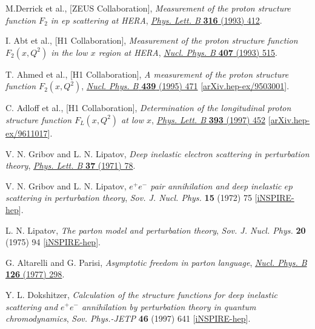 \documentclass[12pt]{article}
\begin{document}
\begin{thebibliography}{99}

M.Derrick et al., [ZEUS Collaboration], \emph{Measurement of the proton structure function $F_2$ in ep scattering at HERA}, \href{https://doi.org/10.1016/0370-2693(93)90347-K}{\emph{Phys. Lett. B} {\bf 316} (1993) 412}.

I. Abt et al., [H1 Collaboration], \emph{Measurement of the proton structure function $F_2(x,Q^2)$ in the low $x$ region at HERA}, \href{https://doi.org/10.1016/0550-3213(93)90090-C}{\emph{Nucl. Phys. B} {\bf 407} (1993) 515}.

T. Ahmed et al., [H1 Collaboration], \emph{A measurement of the proton structure function $F_2(x,Q^2)$}, \href{https://doi.org/10.1016/0550-3213(95)98236-U}{\emph{Nucl. Phys. B} {\bf 439} (1995) 471} [\href{https://doi.org/10.48550/arXiv.hep-ex/9503001}{arXiv.hep-ex/9503001}].

C. Adloff et al., [H1 Collaboration], \emph{Determination of the longitudinal proton structure function $F_L(x,Q^2)$ at low $x$}, \href{https://doi.org/10.1016/S0370-2693(96)01684-X}{\emph{Phys. Lett. B} {\bf 393} (1997) 452} [\href{https://doi.org/10.48550/arXiv.hep-ex/9611017}{arXiv.hep-ex/9611017}].

V. N. Gribov and L. N. Lipatov, \emph{Deep inelastic electron scattering in perturbation theory}, \href{https://doi.org/10.1016/0370-2693(71)90576-4}{\emph{Phys. Lett. B} {\bf 37} (1971) 78}.

V. N. Gribov and L. N. Lipatov, \emph{$e^{+}e^{-}$ pair annihilation and deep inelastic $e p$ scattering in perturbation theory}, \emph{Sov. J. Nucl. Phys.} {\bf 15} (1972) 75 [\href{https://inspirehep.net/literature/73450}{iNSPIRE-hep}].

L. N. Lipatov, \emph{The parton model and perturbation theory}, \emph{Sov. J. Nucl. Phys.} {\bf 20} (1975) 94 [\href{https://inspirehep.net/literature/91556}{iNSPIRE-hep}].

G. Altarelli and G. Parisi, \emph{Asymptotic freedom in parton language}, \href{https://doi.org/10.1016/0550-3213(77)90384-4}{\emph{Nucl. Phys. B} {\bf 126} (1977) 298}.

Y. L. Dokshitzer, \emph{Calculation of the structure functions for deep inelastic scattering and $e^{+}e^{-}$ annihilation by perturbation theory in quantum chromodynamics}, \emph{Sov. Phys.-JETP} {\bf 46} (1997) 641 [\href{https://inspirehep.net/literature/126153}{iNSPIRE-hep}].


\end{thebibliography}
\end{document}
